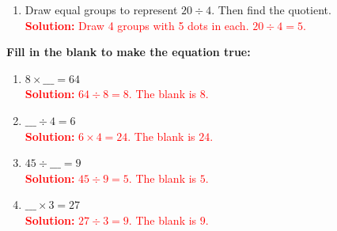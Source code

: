 \documentclass[11pt]{article}
\begin{document}
\begin{tcolorbox}[colframe=black!60, colback=white, 
coltitle=black, colbacktitle=black!15, fonttitle=\bfseries\Large, 
title=Exercises, halign title=center, left=10pt, right=10pt, top=10pt, bottom=60pt]
\begin{enumerate}[start=5, itemsep=6em]
    \item Draw equal groups to represent \(20 \div 4\). Then find the quotient.\\
    \textcolor{red}{\textbf{Solution:} Draw 4 groups with 5 dots in each. \(20 \div 4 = 5\).}
\end{enumerate}

\textbf{Fill in the blank to make the equation true:}
\begin{enumerate}[resume, itemsep=1em]
    \item \(8 \times \_\_\_ = 64\) \\
    \textcolor{red}{\textbf{Solution:} \(64 \div 8 = 8\). The blank is \(8\).}
    
    \item \(\_\_\_ \div 4 = 6\) \\
    \textcolor{red}{\textbf{Solution:} \(6 \times 4 = 24\). The blank is \(24\).}
    
    \item \(45 \div \_\_\_ = 9\) \\
    \textcolor{red}{\textbf{Solution:} \(45 \div 9 = 5\). The blank is \(5\).}
    
    \item \(\_\_\_ \times 3 = 27\) \\
    \textcolor{red}{\textbf{Solution:} \(27 \div 3 = 9\). The blank is \(9\).}
\end{enumerate}
\end{tcolorbox}

\vspace{1em}
\end{document}
